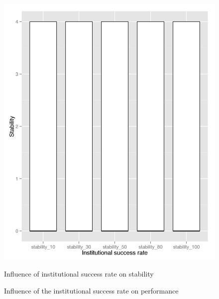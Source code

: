 \documentclass[a4paper]{article}
\begin{document}
\begin{figure}[!ht]
\centering
\includegraphics[width =0.5 \textwidth]{stability_b.jpg}
\label{inst_stability}
\caption{Influence of institutional success rate on stability}
\end{figure}


\begin{figure}[!ht]
\caption{Influence of the institutional success rate on performance}
\label{inst_b}
\end{figure}
\end{document}
